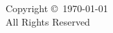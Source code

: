 \makeatletter
\null
\vfill
\thispagestyle{empty}
\vspace*{0in}
\begin{center}
  Copyright \copyright\ \yeardate\today\ \@author \\
  All Rights Reserved
\end{center}
\makeatother
\clearpage
